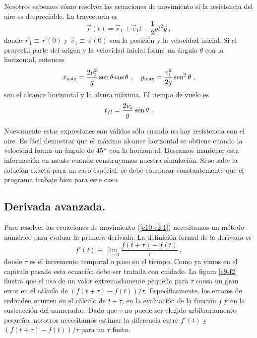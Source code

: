 Nosotros sabemos c{\'o}mo resolver las ecuaciones de movimiento si la
resistencia del aire es despreciable. La trayectoria es
\begin{equation}
\label{c10-e2.4}
\vec{r}(t)=\vec{r}_1+\vec{v}_1t- \frac 12 gt^2 \hat{y}\ ,
\end{equation}
donde $\vec{r}_1\equiv \vec{r}(0)$ y $\vec{v}_1\equiv \vec{v}(0)$ son la
posici{\'o}n y la velocidad inicial. Si el proyectil parte del origen y la
velocidad inicial forma un {\'a}ngulo $\theta$ con la horizontal, entonces
\begin{equation}
\label{c10-e2.5}
x_{\text{m{\'a}x}}=\frac{2v_1^2}{g} \operatorname{sen} \theta\cos\theta \ , \quad
y_{\text{m{\'a}x}} =\frac{v_1^2}{2g} \operatorname{sen}^2 \theta\ ,
\end{equation}
son el alcance horizontal y la altura m{\'a}xima. El tiempo de vuelo es
\begin{equation}
\label{c10-e2.6}
t_{fl}=\frac{2v_1}{g}\operatorname{sen} \theta\ .
\end{equation}

Nuevamente estas expresiones son v{\'a}lidas s{\'o}lo cuando no hay
resistencia con el aire. Es f{\'a}cil demostrar que el m{\'a}ximo alcance
horizontal se obtiene cuando la velocidad forma un {\'a}ngulo de
45$^\circ$ con la horizontal. Deseamos mantener esta informaci{\'o}n en
mente cuando construyamos nuestra simulaci{\'o}n. Si se sabe la soluci{\'o}n
exacta para un caso especial, se debe comparar constantemente que el
programa trabaje bien para este caso.

\subsection{Derivada avanzada.}

Para resolver las ecuaciones de movimiento (\ref{c10-e2.1})
necesitamos un m{\'e}todo num{\'e}rico para evaluar la primera derivada. La
definici{\'o}n formal de la derivada es
\begin{equation}
\label{c10-e2.7}
f'(t)\equiv \lim_{\tau\to0}\frac{f(t+\tau)-f(t)}{\tau}\ ,
\end{equation}
donde $\tau$ es el incremento temporal o paso en el tiempo. Como ya vimos
en el cap{\'\i}tulo pasado esta ecuaci{\'o}n debe ser tratada con cuidado. La
figura \ref{c9-f2} ilustra que el uso de un valor extremadamente
peque{\~n}o para $\tau$ causa un gran error en el c{\'a}lculo de
$(f(t+\tau)-f(t))/\tau$. Espec{\'\i}ficamente, los errores de redondeo ocurren en
el c{\'a}lculo de $t+\tau$, en la evaluaci{\'o}n de la funci{\'o}n $f$ y en la
sustracci{\'o}n del numerador. Dado que $\tau$ no puede ser elegido
arbitrariamente peque{\~n}o, nosotros necesitamos estimar la diferencia
entre $f'(t)$ y $(f(t+\tau)-f(t))/\tau$ para un $\tau$ finito.

